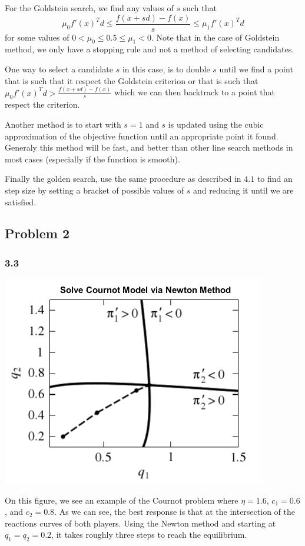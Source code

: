 \documentclass{article}
\begin{document}
For the Goldstein search, we find any values of $s$ such that
$$
\mu_0 f'(x)^Td \leq \frac{f(x+sd)-f(x)}{s}\leq \mu_1 f'(x)^Td
$$
for some values of $0<\mu_0\leq 0.5 \leq \mu_1 <0$. Note that in the case of Goldstein method, we only have a stopping rule and not a method of selecting candidates. 

One way to select a candidate $s$ in this case, is to double $s$ until we find a point that is such that it respect the Goldstein criterion or that is such that $
\mu_0 f'(x)^Td > \frac{f(x+sd)-f(x)}{s}
$ which we can then backtrack to a point that respect the criterion. 

Another method is to start with $s=1$ and $s$ is updated using the cubic approximation of the objective function until an appropriate point it found. Generaly this method will be fast, and better than other line search methods in most cases (especially if the function is smooth).

Finally the golden search, use the same procedure as described in $4.1$ to find an step size by setting a bracket of possible values of $s$ and reducing it until we are satisfied. 

\subsection*{Problem 2}

\subsubsection*{3.3}

\includegraphics[scale=0.7]{3_3}

On this figure, we see an example of the Cournot problem where $\eta=1.6$, $c_1=0.6$, and $c_2=0.8$. As we can see, the best response is that at the intersection of the reactions curves of both players. Using the Newton method and starting at $q_1=q_2=0.2$, it takes roughly three steps to reach the equilibrium. 
\end{document}

